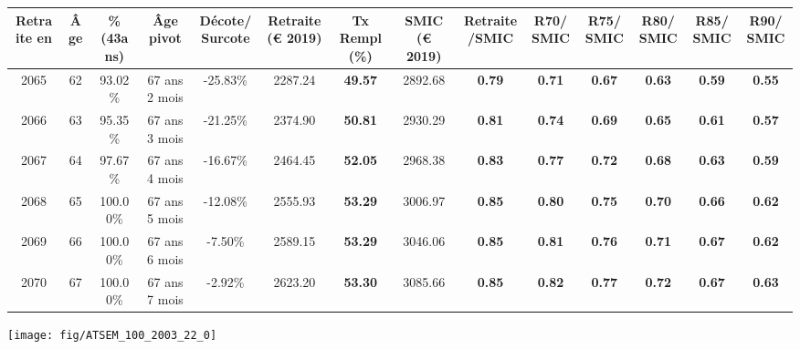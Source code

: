 \begin{adjustbox}{max width=\textwidth} 
\begin{tabular}[htb]{|c|c||c|c|c||c|c||c|c||c|c|c|c|c|} 
\hline 
 Retraite en &  Âge &  \%(43ans) &  Âge pivot &  Décote/Surcote &  Retraite (\euro{} 2019) &  Tx Rempl(\%) &  SMIC (\euro{} 2019) &  Retraite/SMIC &  R70/SMIC &  R75/SMIC &  R80/SMIC &  R85/SMIC &  R90/SMIC \\ 
\hline \hline 
 2065 &  62 &  93.02\% &  67 ans 2 mois &  -25.83\% &  2287.24 &  {\bf 49.57} &  2892.68 &  {\bf {\color{red} 0.79}} &  {\bf {\color{red} 0.71}} &  {\bf {\color{red} 0.67}} &  {\bf {\color{red} 0.63}} &  {\bf {\color{red} 0.59}} &  {\bf {\color{red} 0.55}} \\ 
\hline 
 2066 &  63 &  95.35\% &  67 ans 3 mois &  -21.25\% &  2374.90 &  {\bf 50.81} &  2930.29 &  {\bf {\color{red} 0.81}} &  {\bf {\color{red} 0.74}} &  {\bf {\color{red} 0.69}} &  {\bf {\color{red} 0.65}} &  {\bf {\color{red} 0.61}} &  {\bf {\color{red} 0.57}} \\ 
\hline 
 2067 &  64 &  97.67\% &  67 ans 4 mois &  -16.67\% &  2464.45 &  {\bf 52.05} &  2968.38 &  {\bf {\color{red} 0.83}} &  {\bf {\color{red} 0.77}} &  {\bf {\color{red} 0.72}} &  {\bf {\color{red} 0.68}} &  {\bf {\color{red} 0.63}} &  {\bf {\color{red} 0.59}} \\ 
\hline 
 2068 &  65 &  100.00\% &  67 ans 5 mois &  -12.08\% &  2555.93 &  {\bf 53.29} &  3006.97 &  {\bf {\color{red} 0.85}} &  {\bf {\color{red} 0.80}} &  {\bf {\color{red} 0.75}} &  {\bf {\color{red} 0.70}} &  {\bf {\color{red} 0.66}} &  {\bf {\color{red} 0.62}} \\ 
\hline 
 2069 &  66 &  100.00\% &  67 ans 6 mois &  -7.50\% &  2589.15 &  {\bf 53.29} &  3046.06 &  {\bf {\color{red} 0.85}} &  {\bf {\color{red} 0.81}} &  {\bf {\color{red} 0.76}} &  {\bf {\color{red} 0.71}} &  {\bf {\color{red} 0.67}} &  {\bf {\color{red} 0.62}} \\ 
\hline 
 2070 &  67 &  100.00\% &  67 ans 7 mois &  -2.92\% &  2623.20 &  {\bf 53.30} &  3085.66 &  {\bf {\color{red} 0.85}} &  {\bf {\color{red} 0.82}} &  {\bf {\color{red} 0.77}} &  {\bf {\color{red} 0.72}} &  {\bf {\color{red} 0.67}} &  {\bf {\color{red} 0.63}} \\ 
\hline 
\hline 
\end{tabular} 
\end{adjustbox} 
 
 \vspace{0.1cm} 

 {\hspace{-2.2cm}\texttt{[image: fig/ATSEM\_100\_2003\_22\_0]}} 

